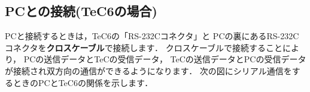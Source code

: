 \subsection{PCとの接続(TeC6の場合)}
PCと接続するときは，TeC6の「RS-232Cコネクタ」と
PCの裏にあるRS-232Cコネクタを{\bf クロスケーブル}で接続します．
クロスケーブルで接続することにより，
PCの送信データとTeCの受信データ，
TeCの送信データとPCの受信データが接続され双方向の通信ができるようになります．
次の図にシリアル通信をするときのPCとTeC6の関係を示します．

\begin{center}
\epsfxsize=7.5cm
\end{center}



%
%
%
%

